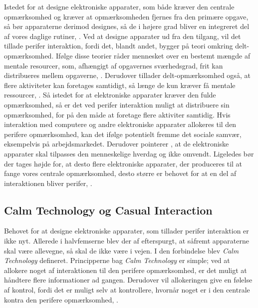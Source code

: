 Istedet for at designe elektroniske apparater, som både kræver den centrale opmærksomhed og kræver at opmærksomheden fjernes fra den primære opgave, så bør apparaterne derimod designes, så de i højere grad bliver en integreret del af vores daglige rutiner, \parencite[s. 239]{PDF:PICharacteristicsAndConsiderations}. Ved at designe apparater ud fra den tilgang, vil det tillade perifer interaktion, fordi det, blandt andet, bygger på teori omkring delt-opmærksomhed. Ifølge disse teorier råder mennesket over en bestemt mængde af mentale resourcer, som, afhængigt af opgavernes sværhedsgrad, frit kan distribueres mellem opgaverne, \parencite[s. 240]{PDF:PICharacteristicsAndConsiderations}. Derudover tillader delt-opmærksomhed også, at flere aktiviteter kan foretages samtidigt, så længe de kun kræver få mentale ressourcer, \parencite[s. 2]{PDF:FacilitatingPIDesignAndEvaluation}. Så istedet for at elektroniske apparater kræver den fulde opmærksomhed, så er det ved perifer interaktion muligt at distribuere sin opmærksomhed, for på den måde at foretage flere aktiviter samtidig. Hvis interaktion med computere og andre elektroniske apparater allokeres til den perifere opmærksomhed, kan det ifølge \textcite[s. 11]{PDF:TheComputerWeiser} potentielt fremme det sociale samvær, eksempelvis på arbejdsmarkedet. Derudover pointerer \textcite[s. 11]{PDF:TheComputerWeiser}, at de elektroniske apparater skal tilpasses den menneskelige hverdag og ikke omvendt. Ligeledes bør der tages højde for, at desto flere elektroniske apparater, der produceres til at fange vores centrale opmærksomhed, desto større er behovet for at en del af interaktionen bliver perifer, \parencite[s. 240]{PDF:PICharacteristicsAndConsiderations}.
%
\subsection{Calm Technology og Casual Interaction}
\label{CasualOgCalm}
%
Behovet for at designe elektroniske apparater, som tillader perifer interaktion er ikke nyt. Allerede i halvfemserne blev der af \textcite[s. 3]{PDF:TheComingAgeOfCalmTech} efterspurgt, at såfremt apparaterne skal være allevegne, så skal de ikke være i vejen. I den forbindelse blev \textit{Calm Technology} defineret. Principperne bag \textit{Calm Technology} er simple; ved at allokere noget af interaktionen til den perifere opmærksomhed, er det muligt at håndtere flere informationer ad gangen. Derudover vil allokeringen give en følelse af kontrol, fordi det er muligt selv at kontrollere, hvornår noget er i den centrale kontra den perifere opmærksomhed, \parencite[s. 4]{PDF:TheComingAgeOfCalmTech}. 


